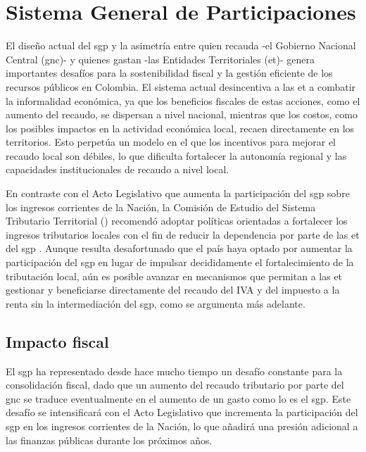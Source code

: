 \section{Sistema General de Participaciones}

El diseño actual del \gls{sgp} y la asimetría entre quien recauda -el Gobierno Nacional Central (\gls{gnc})- y quienes gastan -las Entidades Territoriales (\gls{et})- genera importantes desafíos para la sostenibilidad fiscal y la gestión eficiente de los recursos públicos en Colombia. El sistema actual desincentiva a las \gls{et} a combatir la informalidad económica, ya que los beneficios fiscales de estas acciones, como el aumento del recaudo, se dispersan a nivel nacional, mientras que los costos, como los posibles impactos en la actividad económica local, recaen directamente en los territorios. Esto perpetúa un modelo en el que los incentivos para mejorar el recaudo local son débiles, lo que dificulta fortalecer la autonomía regional y las capacidades institucionales de recaudo a nivel local.

En contraste con el Acto Legislativo que aumenta la participación del \gls{sgp} sobre los ingresos corrientes de la Nación, la Comisión de Estudio del Sistema Tributario Territorial (\cite{CEDE2020}) recomendó adoptar políticas orientadas a fortalecer los ingresos tributarios locales con el fin de reducir la dependencia por parte de las \gls{et} del \gls{sgp} . Aunque resulta desafortunado que el país haya optado por aumentar la participación del \gls{sgp} en lugar de impulsar decididamente el fortalecimiento de la tributación local, aún es posible avanzar en mecanismos que permitan a las \gls{et} gestionar y beneficiarse directamente del recaudo del IVA y del impuesto a la renta sin la intermediación del \gls{sgp}, como se argumenta más adelante.


\subsection{Impacto fiscal}

El \gls{sgp} ha representado desde hace mucho tiempo un desafío constante para la consolidación fiscal, dado que un aumento del recaudo tributario por parte del \gls{gnc} se traduce eventualmente en el aumento de un gasto como lo es el \gls{sgp}. Este desafío se intensificará con el Acto Legislativo que incrementa la participación del \gls{sgp} en los ingresos corrientes de la Nación, lo que añadirá una presión adicional a las finanzas públicas durante los próximos años. 

